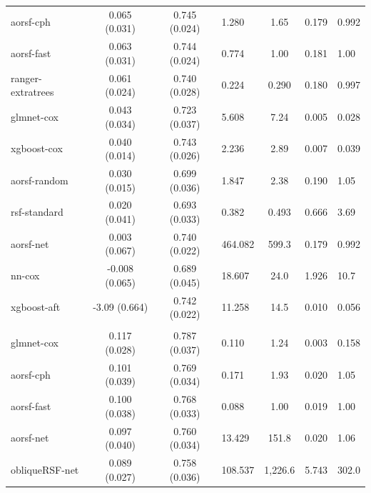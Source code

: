 \documentclass[twoside,11pt]{article}\usepackage[]{graphicx}\usepackage[]{xcolor}
\newenvironment{knitrout}{}{} %
\begin{document}
\begin{knitrout}
\begin{longtable}{lcclccl}
\hspace{1em}aorsf-cph & 0.065 (0.031) & 0.745 (0.024) & 1.280 & 1.65 & 0.179 & 0.992\\
\hspace{1em}aorsf-fast & 0.063 (0.031) & 0.744 (0.024) & 0.774 & 1.00 & 0.181 & 1.00\\
\hspace{1em}ranger-extratrees & 0.061 (0.024) & 0.740 (0.028) & 0.224 & 0.290 & 0.180 & 0.997\\
\hspace{1em}glmnet-cox & 0.043 (0.034) & 0.723 (0.037) & 5.608 & 7.24 & 0.005 & 0.028\\
\hspace{1em}xgboost-cox & 0.040 (0.014) & 0.743 (0.026) & 2.236 & 2.89 & 0.007 & 0.039\\
\hspace{1em}aorsf-random & 0.030 (0.015) & 0.699 (0.036) & 1.847 & 2.38 & 0.190 & 1.05\\
\hspace{1em}rsf-standard & 0.020 (0.041) & 0.693 (0.033) & 0.382 & 0.493 & 0.666 & 3.69\\
\hspace{1em}aorsf-net & 0.003 (0.067) & 0.740 (0.022) & 464.082 & 599.3 & 0.179 & 0.992\\
\hspace{1em}nn-cox & -0.008 (0.065) & 0.689 (0.045) & 18.607 & 24.0 & 1.926 & 10.7\\
\hspace{1em}xgboost-aft & -3.09 (0.664) & 0.742 (0.022) & 11.258 & 14.5 & 0.010 & 0.056\\
\addlinespace[0.3em]
\hline
\multicolumn{7}{l}{\textit{\textbf{FCL; death, n = 541, p = 7}}}\\
\hline
\hspace{1em}glmnet-cox & 0.117 (0.028) & 0.787 (0.037) & 0.110 & 1.24 & 0.003 & 0.158\\
\hspace{1em}aorsf-cph & 0.101 (0.039) & 0.769 (0.034) & 0.171 & 1.93 & 0.020 & 1.05\\
\hspace{1em}aorsf-fast & 0.100 (0.038) & 0.768 (0.033) & 0.088 & 1.00 & 0.019 & 1.00\\
\hspace{1em}aorsf-net & 0.097 (0.040) & 0.760 (0.034) & 13.429 & 151.8 & 0.020 & 1.06\\
\hspace{1em}obliqueRSF-net & 0.089 (0.027) & 0.758 (0.036) & 108.537 & 1,226.6 & 5.743 & 302.0\\

\end{longtable}
\end{knitrout}
\end{document}
